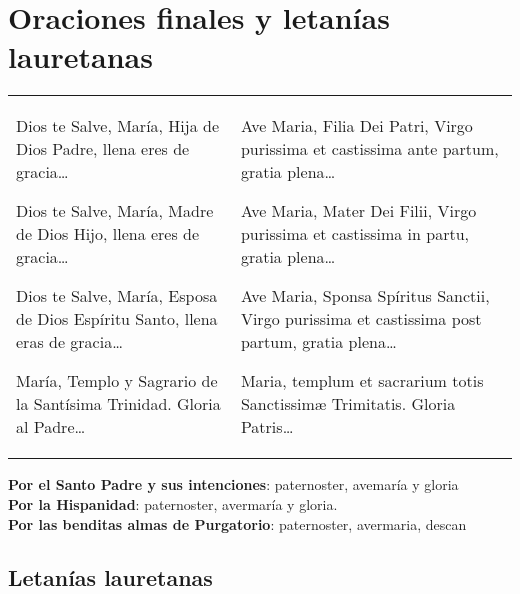 \documentclass[./rosary.tex]{subfiles}
\begin{document}
\section*{Oraciones finales y letanías lauretanas}
\label{sec:final-prayer}

\begin{longtable} { p{} p{} }
    Dios te Salve, María, Hija de Dios Padre, llena eres de gracia{\ldots}

    Dios te Salve, María, Madre de Dios Hijo, llena eres de gracia{\ldots}

    Dios te Salve, María, Esposa de Dios Espíritu Santo, llena eras de gracia{\ldots}

    María, Templo y Sagrario de la Santísima Trinidad. Gloria al Padre{\ldots}

                                                                                          &

    Ave Maria, Filia Dei Patri, Virgo purissima et castissima ante partum, gratia plena{\ldots}

    Ave Maria, Mater Dei Filii, Virgo purissima et castissima in partu, gratia plena{\ldots}

    Ave Maria, Sponsa Spíritus Sanctii, Virgo purissima et castissima post partum, gratia plena{\ldots}

    Maria, templum et sacrarium totis Sanctissimæ Trimitatis. Gloria Patris{\ldots}
\end{longtable}

\noindent\textbf{Por el Santo Padre y sus intenciones}: paternoster, avemaría y gloria\\
\noindent\textbf{Por la Hispanidad}: paternoster, avermaría y gloria.\\
\noindent\textbf{Por las benditas almas de Purgatorio}: paternoster, avermaria, descan

\subsection*{Letanías lauretanas}
\end{document}
